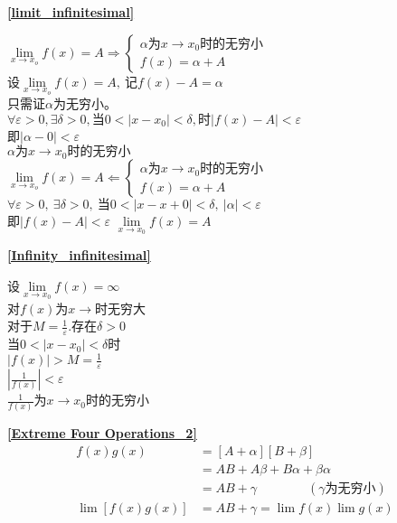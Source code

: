 \textbf{\large \ref{limit_infinitesimal}}
\begin{center}
   $\lim\limits_{x\to x_o}f(x)=A\Rightarrow \begin{cases}
    \alpha\mbox{为}x\rightarrow x_0 \mbox{时的无穷小}\\
    f(x)=\alpha+A
\end{cases}$\\
设$\lim\limits_{x\to x_o}f(x)=A,\ \mbox{记}f(x)-A=\alpha$\\
只需证$\alpha$为无穷小。\\
$\forall\varepsilon>0,\exists\delta>0,\mbox{当}0<\left|x-x_0\right|<\delta,\mbox{时}\left|f(x)-A\right|<\varepsilon$\\
即$\left|\alpha-0\right|<\varepsilon$\\
$\alpha\mbox{为}x\rightarrow x_0\mbox{时的无穷小}$\\
$\lim\limits_{x\to x_o}f(x)=A\Leftarrow \begin{cases}
    \alpha\mbox{为}x\rightarrow x_0 \mbox{时的无穷小}\\
    f(x)=\alpha+A
\end{cases}$\\
$\forall \varepsilon >0,\ \exists \delta >0,\ \mbox{当}0<\left|x-x+0\right|<\delta,\ \left|\alpha\right|<\varepsilon$\\
$\mbox{即}\left|f(x)-A\right|<\varepsilon$
$\lim\limits_{x\to x_0}f(x)=A$
\end{center}


\textbf{\large \ref{Infinity_infinitesimal}}
\begin{center}
    设$\lim\limits_{x\to x_0}f(x)=\infty$\\
对$f(x)$为$x\rightarrow$时无穷大\\
对于$M=\frac{1}{\varepsilon}$.存在$\delta>0$\\
当$0<\left|x-x_0\right|<\delta$时\\
$\left|f(x)\right|>M=\frac{1}{\varepsilon}$\\
$\left|\frac{1}{f(x)}\right|<\varepsilon$\\
$\frac{1}{f(x)}$为$x\rightarrow x_0$时的无穷小
\end{center}

\textbf{\large \ref{Extreme Four Operations_2}}
\begin{align*}
        f(x)g(x)&=\left[A+\alpha\right]\left[B+\beta\right]\\
        &=AB+A\beta+B\alpha+\beta\alpha\\
        &=AB+\gamma\qquad\qquad(\gamma\mbox{为无穷小})\\
        \lim\left[f(x)g(x)\right]&=AB+\gamma=\lim f(x)\lim g(x)
\end{align*}

